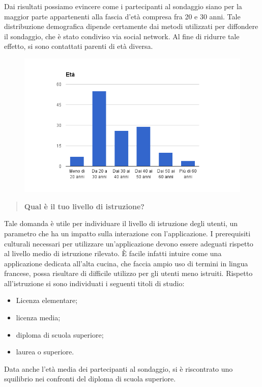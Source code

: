 Dai risultati possiamo evincere come i partecipanti al sondaggio siano per la maggior parte appartenenti alla fascia d'età compresa
fra 20 e 30 anni. Tale distribuzione demografica dipende certamente dai metodi utilizzati per diffondere il sondaggio, che è stato
condiviso via social network. Al fine di ridurre tale effetto, si sono contattati parenti di età diversa.

\begin{figure}[H]
	\centering
	\includegraphics[scale=0.6]{img/chart_eta}
\end{figure}

\begin{quote}
	\textbf{Qual è il tuo livello di istruzione?}
\end{quote}
Tale domanda è utile per individuare il livello di istruzione degli utenti, un parametro che ha un impatto sulla interazione con l'applicazione.
I prerequisiti culturali necessari per utilizzare un'applicazione devono essere adeguati rispetto al livello medio di istruzione rilevato.
È facile infatti intuire come una applicazione dedicata all'alta cucina, che faccia ampio uso di termini in lingua francese, possa
risultare di difficile utilizzo per gli utenti meno istruiti.
Rispetto all'istruzione si sono individuati i seguenti titoli di studio:
\begin{itemize}
	\item Licenza elementare;
	\item licenza media;
	\item diploma di scuola superiore;
	\item laurea o superiore.
\end{itemize}
Data anche l'età media dei partecipanti al sondaggio, si è riscontrato uno squilibrio nei confronti del diploma di scuola superiore.

